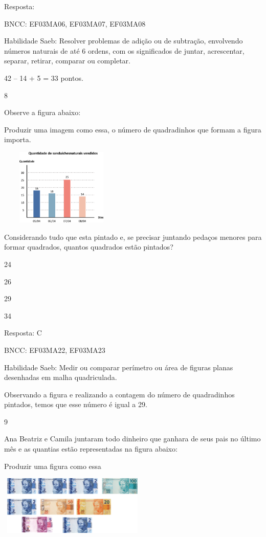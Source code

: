 \begin{escolha}
{\begin{escolha}
{Resposta:

BNCC: EF03MA06, EF03MA07, EF03MA08

Habilidade Saeb: Resolver problemas de adição ou de subtração,
envolvendo números naturais de até 6 ordens, com os significados de
juntar, acrescentar, separar, retirar, comparar ou completar.

42 -- 14 + 5 = 33 pontos.

\num{8}

Observe a figura abaixo:

Produzir uma imagem como essa, o número de quadradinhos que formam a
figura importa.

\includegraphics[width=2.32692in,height=1.43990in]{media/image109.png}

Considerando tudo que esta pintado e, se precisar juntando pedaços
menores para formar quadrados, quantos quadrados estão pintados?

\begin{escolha}
\item
  24
\item
  26
\item
  29
\item
  34
\end{escolha}

Resposta: C

BNCC: EF03MA22, EF03MA23

Habilidade Saeb: Medir ou comparar perímetro ou área de figuras planas
desenhadas em malha quadriculada.

Observando a figura e realizando a contagem do número de quadradinhos
pintados, temos que esse número é igual a 29.

\num{9}

Ana Beatriz e Camila juntaram todo dinheiro que ganhara de seus pais no
último mês e as quantias estão representadas na figura abaixo:

Produzir uma figura como essa

\includegraphics[width=2.77564in,height=1.11703in]{media/image110.png}

}
\end{escolha}}
\end{escolha}
